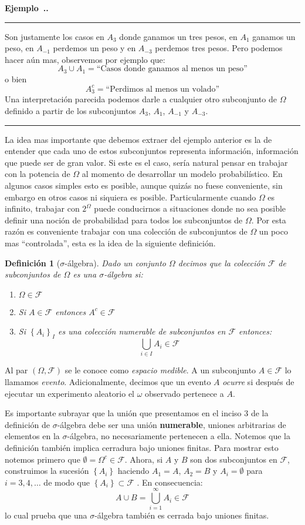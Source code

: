 \documentclass{extreport}
\newcounter{example}[chapter]
\newenvironment{example}[1][]{\refstepcounter{example}\par\medskip
   \noindent\textbf{Ejemplo~\thechapter.\theexample. #1 }\par\medskip\hrule \rmfamily\par\medskip}{\medskip\hrule\medskip}
\theoremstyle{definicion}
\newtheorem{definition}{Definición}[chapter]
\theoremstyle{propiedad}
\theoremstyle{teorema}
\begin{document}
\begin{example}
Son justamente los casos en $A_3$ donde ganamos un tres pesos, en $A_1$ ganamos un peso, en $A_{-1}$ perdemos un peso y en $A_{-3}$ perdemos tres pesos. Pero podemos hacer aún mas, observemos por ejemplo que:
$$
A_3 \cup A_1 = \text{``Casos donde ganamos al menos un peso''}
$$
o bien
$$
A_3^c = \text{``Perdimos al menos un volado''}
$$
Una interpretación parecida podemos darle a cualquier otro subconjunto de $\Omega$ definido a partir de los subconjuntos $A_3$, $A_1$, $A_{-1}$ y $A_{-3}$. 
\end{example}

La idea mas importante que debemos extraer del ejemplo anterior es la de entender que cada uno de estos subconjuntos representa información, información que puede ser de gran valor. Si este es el caso, sería natural pensar en trabajar con la potencia de $\Omega$ al momento de desarrollar un modelo probabilístico. En algunos casos simples esto es posible, aunque quizás no fuese conveniente, sin embargo en otros casos ni siquiera es posible. Particularmente cuando $\Omega$ es infinito, trabajar con $2^\Omega$ puede conducirnos a situaciones donde no sea posible definir una noción de probabilidad para todos los subconjuntos de $\Omega$. Por esta razón es conveniente trabajar con una colección de subconjuntos de $\Omega$ un poco mas ``controlada'', esta es la idea de la siguiente definición. 
\begin{definition}[$\sigma$-álgebra]
    Dado un conjunto $\Omega$ decimos que la colección $\mathcal{F}$ de subconjuntos de $\Omega$ es una $\sigma$-\emph{álgebra} si:
    \begin{enumerate}
        \item $\Omega \in \mathcal{F}$
        \item Si $A\in \mathcal{F}$ entonces $A^c \in \mathcal{F}$
        \item Si $\left\{A_i\right\}_{I}$ es una colección numerable de subconjuntos en $\mathcal{F}$ entonces:
        $$
            \bigcup_{i\in I} A_i \in \mathcal{F}
        $$
    \end{enumerate}
\end{definition}
\par\noindent
Al par $(\Omega, \mathcal{F})$  se le conoce como \emph{espacio medible}. A un subconjunto $A\in \mathcal{F}$ lo llamamos \emph{evento}. Adicionalmente, decimos que un evento $A$ \emph{ocurre} si después de ejecutar un experimento aleatorio el $\omega$ observado pertenece a $A$.

Es importante subrayar que la unión que presentamos en el inciso 3 de la definición de $\sigma$-álgebra debe ser una unión \textbf{numerable}, uniones arbitrarias de elementos en la $\sigma$-álgebra, no necesariamente pertenecen a ella. Notemos que la definición también implica cerradura bajo uniones finitas. Para mostrar esto notemos primero que $\emptyset = \Omega^c \in \mathcal{F}$.  Ahora, si $A$ y $B$ son dos subconjuntos en $\mathcal{F}$, construimos la sucesión $\left\{A_i\right\}$ haciendo $A_1 = A$, $A_2 = B$ y $A_i = \emptyset$ para $i= 3,4,\ldots$ de modo  que  $\left\{A_i\right\}\subset \mathcal{F}$ . En consecuencia:
$$
A \cup B = \bigcup_{i = 1}^\infty A_i \in \mathcal{F}
$$
lo cual prueba que una $\sigma$-álgebra también es cerrada bajo uniones finitas. 
\end{document}

